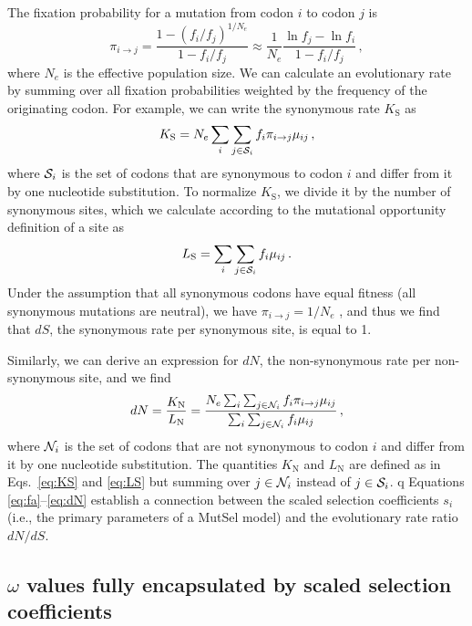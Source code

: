 \documentclass[11pt]{article}
\begin{document}
The fixation probability for a mutation from codon $i$ to codon $j$ is \cite{HalpernBruno1998,SellaHirsh2005}
\begin{equation}\label{eq:pi}
  \pi_{i\rightarrow j} = \frac{1-(f_i/f_j)^{1/N_e}}{1-f_i/f_j}
  \approx \frac{1}{N_e} \frac{\ln f_j - \ln f_i}{1-f_i/f_j}\,,
\end{equation}
where $N_e$ is the effective population size. We can calculate an evolutionary rate by summing over all fixation probabilities weighted by the frequency of the originating codon. For example, we can write the synonymous rate $K_\text{S}$ as
\begin{equation}\label{eq:KS}
  K_\text{S} = N_e \sum_i \sum_{j \in {\cal S}_i} f_i  \pi_{i\rightarrow j}\mu_{ij}\,,
\end{equation}
where ${\cal S}_i$ is the set of codons that are synonymous to codon $i$ and differ from it by one nucleotide substitution. To normalize $K_\text{S}$, we divide it by the number of synonymous sites, which we calculate according to the mutational opportunity definition of a site \cite{GoldmanYang1994, Yang2006} as 
\begin{equation}\label{eq:LS}
  L_\text{S} = \sum_i \sum_{j \in {\cal S}_i} f_i \mu_{ij} \,.
\end{equation}
Under the assumption that all synonymous codons have equal fitness (all synonymous mutations are neutral), we have $\pi_{i\rightarrow j}=1/N_e$ \cite{CrowKimura1970}, and thus we find that $dS$, the synonymous rate per synonymous site, is equal to 1.

Similarly, we can derive an expression for $dN$, the non-synonymous rate per non-synonymous site, and we find
\begin{equation}\label{eq:dN}
  dN = \frac{K_\text{N}}{L_\text{N}}=\frac{ N_e \sum_i \sum_{j \in {\cal N}_i} f_i  \pi_{i\rightarrow j}\mu_{ij}}{\sum_i \sum_{j \in {\cal N}_i} f_i\mu_{ij}}\,,
\end{equation}
where ${\cal N}_i$ is the set of codons that are not synonymous to codon $i$ and differ from it by one nucleotide substitution. The quantities $K_\text{N}$ and $L_\text{N}$ are defined as in Eqs.~\eqref{eq:KS} and \eqref{eq:LS} but summing over $j\in {\cal N}_i$ instead of $j\in {\cal S}_i$. q
Equations \eqref{eq:fa}--\eqref{eq:dN} establish a connection between the scaled selection coefficients $s_i$ (i.e., the primary parameters of a MutSel model) and the evolutionary rate ratio $dN/dS$. 


\subsection*{$\omega$ values fully encapsulated by scaled selection coefficients}
\end{document}
